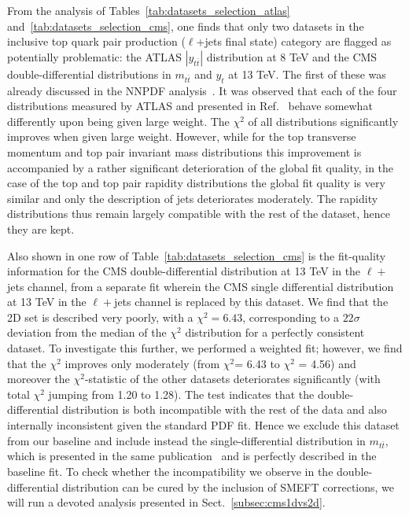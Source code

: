 \documentclass[withindex,glossary]{cam-thesis}
\begin{document}
  
    

    From the analysis of Tables~\ref{tab:datasets_selection_atlas} and~\ref{tab:datasets_selection_cms},
    one finds that only two datasets in the inclusive
    top quark pair production ($\ell$+jets final state) category are flagged as potentially
    problematic: the ATLAS $|y_{t\bar{t}}|$ distribution at 8 TeV
    and the CMS double-differential distributions in $m_{t\bar{t}}$ and $y_{t}$
    at 13 TeV.
    The first of these was already discussed in the NNPDF
    analysis~\cite{NNPDF:2021njg}. It was observed that each of the
    four distributions measured by ATLAS and presented in
    Ref.~\cite{Aad:2015mbv} behave somewhat differently upon being
    given large weight. The $\chi^2$ of all distributions significantly improves when given
large weight. However, while for the top transverse momentum and top pair invariant mass distributions this improvement is accompanied by a rather significant deterioration of the global fit quality, in the case of the top and
top pair rapidity distributions the global fit quality is very similar and only the description of jets
deteriorates moderately. The rapidity distributions thus remain
largely compatible with the rest of the dataset, hence they are kept.

    Also shown in one row of Table~\ref{tab:datasets_selection_cms} is the 
    fit-quality information for the CMS double-differential distribution at 13 TeV in the $\ell+$jets 
    channel, from a separate fit wherein the CMS single differential distribution at 13 TeV in the 
    $\ell+$jets channel is replaced by this dataset. We find that the
    2D set is described very poorly, with a $\chi^2=6.43$,
    corresponding to a $22\sigma$ deviation from the median of the $\chi^2$ distribution
  for a perfectly consistent dataset. To investigate this further, we performed a weighted fit; however, we find that the $\chi^2$
    improves only moderately (from $\chi^2$=
    6.43 to $\chi^2$ = 4.56) and moreover the $\chi^2$-statistic of the other datasets deteriorates
    significantly (with total $\chi^2$ jumping from 1.20 to 1.28). The test
    indicates that the double-differential distribution is both incompatible
    with the rest of the data and also internally inconsistent given the
    standard PDF fit. Hence we exclude this dataset from our baseline and
    include instead the single-differential distribution in $m_{t\bar{t}}$,
    which is presented in the same publication~\cite{CMS:2021vhb} and is
    perfectly described in the baseline fit.  To check whether the
    incompatibility we observe in the double-differential distribution can be
    cured by the inclusion of SMEFT corrections, we will run a devoted analysis
    presented in Sect.~\ref{subsec:cms1dvs2d}.
\end{document}
